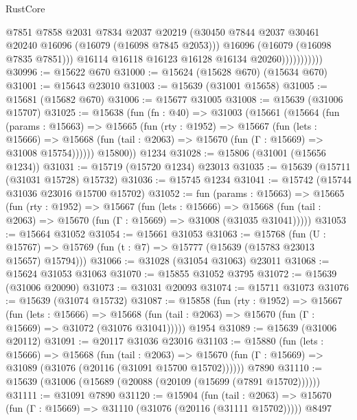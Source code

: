 \begin{lexlean}{RustCore}
\begin{coremodule}
                            @7851
                            @7858
                            @2031
                            @7834
                            @2037
                            @20219
                            (@30450 @7844 @2037 @30461 @20240 @16096 (@16079 (@16098 @7845 @2053)))
                            @16096
                            (@16079 (@16098 @7835 @7851)))
                          @16114
                          @16118
                          @16123
                          @16128
                          @16134
                          @20260)))))))))))
@30996 := @15622 @670
@31000 := @15624 (@15628 @670) (@15634 @670)
@31001 := @15643 @23010
@31003 := @15639 (@31001 @15658)
@31005 := @15681 (@15682 @670)
@31006 := @15677 @31005
@31008 := @15639 (@31006 @15707)
@31025 := @15638
    (fun (fn : @40) =>
    @31003
      (@15661
        (@15664
          (fun (params : @15663) =>
          @15665
            (fun (rty : @1952) =>
            @15667
              (fun (lets : @15666) =>
              @15668 (fun (tail : @2063) => @15670 (fun (Γ : @15669) => @31008 @15754))))))
        @15800))
    @1234
@31028 := @15806 (@31001 (@15656 @1234))
@31031 := @15719 (@15720 @1234) @23013
@31035 := @15639 (@15711 (@31031 @15728) @15732)
@31036 := @15745 @1234
@31041 := @15742 (@15744 @31036 @23016 @15700 @15702)
@31052 := fun (params : @15663) =>
  @15665
    (fun (rty : @1952) =>
    @15667
      (fun (lets : @15666) =>
      @15668 (fun (tail : @2063) => @15670 (fun (Γ : @15669) => @31008 (@31035 @31041)))))
@31053 := @15664 @31052
@31054 := @15661 @31053
@31063 := @15768
    (fun (U : @15767) => @15769 (fun (t : @7) => @15777 (@15639 (@15783 @23013 @15657) @15794)))
@31066 := @31028 (@31054 @31063) @23011
@31068 := @15624 @31053 @31063
@31070 := @15855 @31052 @3795
@31072 := @15639 (@31006 @20090)
@31073 := @31031 @20093
@31074 := @15711 @31073
@31076 := @15639 (@31074 @15732)
@31087 := @15858
    (fun (rty : @1952) =>
    @15667
      (fun (lets : @15666) =>
      @15668 (fun (tail : @2063) => @15670 (fun (Γ : @15669) => @31072 (@31076 @31041)))))
    @1954
@31089 := @15639 (@31006 @20112)
@31091 := @20117 @31036 @23016
@31103 := @15880
    (fun (lets : @15666) =>
    @15668
      (fun (tail : @2063) =>
      @15670 (fun (Γ : @15669) => @31089 (@31076 (@20116 (@31091 @15700 @15702))))))
    @7890
@31110 := @15639 (@31006 (@15689 (@20088 (@20109 (@15699 (@7891 @15702))))))
@31111 := @31091 @7890
@31120 := @15904
    (fun (tail : @2063) => @15670 (fun (Γ : @15669) => @31110 (@31076 (@20116 (@31111 @15702)))))
    @8497

\end{coremodule}
\end{lexlean}
